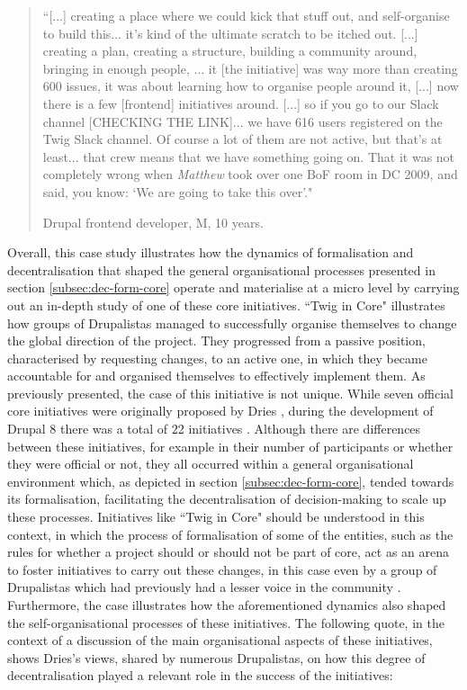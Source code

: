 \begin{quotation}
``[...] creating a place where we could kick that stuff out, and self-organise to build this... it's kind of the ultimate scratch to be itched out. [...] creating a plan, creating a structure, building a community around, bringing in enough people, ... it [the initiative] was way more than creating 600 issues, it was about learning how to organise people around it, [...] now there is a few [frontend] initiatives around. [...] so if you go to our Slack channel [CHECKING THE LINK]... we have 616 users registered on the Twig Slack channel. Of course a lot of them are not active, but that's at least...  that crew means that we have something going on. That it was not completely wrong when \textit{Matthew} took over one BoF room in DC 2009, and said, you know: `We are going to take this over'."

\begin{flushright}\footnotesize{Drupal frontend developer, M, 10 years.}\end{flushright}
\end{quotation}

Overall, this case study illustrates how the dynamics of formalisation and decentralisation that shaped the general organisational processes presented in section \ref{subsec:dec-form-core} operate and materialise at a micro level by carrying out an in-depth study of one of these core initiatives. ``Twig in Core" illustrates how groups of Drupalistas managed to successfully organise themselves to change the global direction of the project. They progressed from a passive position, characterised by requesting changes, to an active one, in which they became accountable for and organised themselves to effectively implement them. As previously presented, the case of this initiative is not unique. While seven official core initiatives were originally proposed by Dries \parencite{d8-official-initiatives:Online}, during the development of Drupal 8 there was a total of 22 initiatives \parencite{d8-all-initiatives:Online}. Although there are differences between these initiatives, for example in their number of participants or whether they were official or not, they all occurred within a general organisational environment which, as depicted in section \ref{subsec:dec-form-core}, tended towards its formalisation, facilitating the decentralisation of decision-making to scale up these processes. Initiatives like ``Twig in Core" should be understood in this context, in which the process of formalisation of some of the entities, such as the rules for whether a project should or should not be part of core, act as an arena to foster initiatives to carry out these changes, in this case even by a group of Drupalistas which had previously had a lesser voice in the community \parencite{Zilouchian2011}. Furthermore, the case illustrates how the aforementioned dynamics also shaped the self-organisational processes of these initiatives. The following quote, in the context of a discussion of the main organisational aspects of these initiatives, shows Dries's views, shared by numerous Drupalistas, on how this degree of decentralisation played a relevant role in the success of the initiatives:

